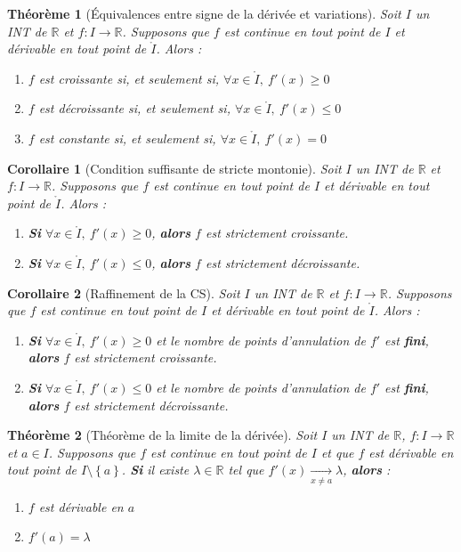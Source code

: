 \documentclass[french]{book}
\newcommand{\R}{\mathbb{R}}
\theoremstyle{plain}
\newtheorem{thm}{Théorème}[chapter]
\newtheorem{cor}{Corollaire}[chapter]
\theoremstyle{definition}
\theoremstyle{remark}
\begin{document}
\begin{thm}[Équivalences entre signe de la dérivée et variations]
	Soit $I$ un INT de $\R$ et $f:I\rightarrow\R$. Supposons que $f$ est continue en tout point de $I$ et dérivable en tout point de $\mathring{I}$. Alors :
	\begin{enumerate}
		\item $f$ est croissante si, et seulement si, $\forall x \in\mathring{I}, \ f'(x)\geqslant 0$
		\item $f$ est décroissante si, et seulement si, $\forall x \in\mathring{I}, \ f'(x)\leqslant 0$
		\item $f$ est constante si, et seulement si, $\forall x \in\mathring{I}, \ f'(x)= 0$
	\end{enumerate}
\end{thm}
\begin{cor}[Condition suffisante de stricte montonie]
	Soit $I$ un INT de $\R$ et $f:I\rightarrow\R$. Supposons que $f$ est continue en tout point de $I$ et dérivable en tout point de $\mathring{I}$. Alors :
	\begin{enumerate}
		\item \textbf{Si} $\forall x \in\mathring{I}, \ f'(x)\geqslant0$, \textbf{alors} $f$ est strictement croissante.
		\item \textbf{Si} $\forall x \in\mathring{I}, \ f'(x)\leqslant0$, \textbf{alors} $f$ est strictement décroissante.
	\end{enumerate}
\end{cor}
\begin{cor}[Raffinement de la CS]
	Soit $I$ un INT de $\R$ et $f:I\rightarrow\R$. Supposons que $f$ est continue en tout point de $I$ et dérivable en tout point de $\mathring{I}$. Alors :
	\begin{enumerate}
		\item\textbf{Si} $\forall x \in\mathring{I}, \ f'(x)\geqslant 0$ et le nombre de points d'annulation de $f'$ est \textbf{fini}, \textbf{alors} $f$ est strictement croissante.
		\item\textbf{Si} $\forall x \in\mathring{I}, \ f'(x)\leqslant 0$ et le nombre de points d'annulation de $f'$ est \textbf{fini}, \textbf{alors} $f$ est strictement décroissante.
	\end{enumerate}
\end{cor}
\begin{thm}[Théorème de la limite de la dérivée]
	Soit $I$ un INT de $\R$, $f:I\rightarrow\R$ et $a\in I$. Supposons que $f$ est continue en tout point de $I$ et que $f$ est dérivable en tout point de $I\setminus \left\{a\right\}$. \textbf{Si} il existe $\lambda\in\R$ tel que $f'(x)\xrightarrow[x\ne a]{} \lambda$, \textbf{alors} :
	\begin{enumerate}
		\item $f$ est dérivable en $a$
		\item $f'(a)=\lambda$
	\end{enumerate}
\end{thm}
\end{document}
